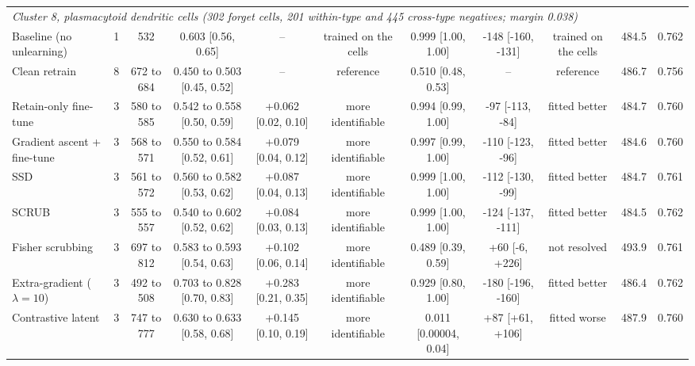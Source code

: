 \begin{tabular}{lcccccccccc}
\midrule
\multicolumn{11}{l}{\emph{Cluster 8, plasmacytoid dendritic cells (302 forget cells, 201 within-type and 445 cross-type negatives; margin 0.038)}} \\
Baseline (no unlearning) & 1 & 532 & 0.603 [0.56, 0.65] & -- & trained on the cells & 0.999 [1.00, 1.00] & -148 [-160, -131] & trained on the cells & 484.5 & 0.762 \\
Clean retrain & 8 & 672 to 684 & 0.450 to 0.503 [0.45, 0.52] & -- & reference & 0.510 [0.48, 0.53] & -- & reference & 486.7 & 0.756 \\
\midrule
Retain-only fine-tune & 3 & 580 to 585 & 0.542 to 0.558 [0.50, 0.59] & +0.062 [0.02, 0.10] & more identifiable & 0.994 [0.99, 1.00] & -97 [-113, -84] & fitted better & 484.7 & 0.760 \\
Gradient ascent + fine-tune & 3 & 568 to 571 & 0.550 to 0.584 [0.52, 0.61] & +0.079 [0.04, 0.12] & more identifiable & 0.997 [0.99, 1.00] & -110 [-123, -96] & fitted better & 484.6 & 0.760 \\
SSD & 3 & 561 to 572 & 0.560 to 0.582 [0.53, 0.62] & +0.087 [0.04, 0.13] & more identifiable & 0.999 [1.00, 1.00] & -112 [-130, -99] & fitted better & 484.7 & 0.761 \\
SCRUB & 3 & 555 to 557 & 0.540 to 0.602 [0.52, 0.62] & +0.084 [0.03, 0.13] & more identifiable & 0.999 [1.00, 1.00] & -124 [-137, -111] & fitted better & 484.5 & 0.762 \\
Fisher scrubbing & 3 & 697 to 812 & 0.583 to 0.593 [0.54, 0.63] & +0.102 [0.06, 0.14] & more identifiable & 0.489 [0.39, 0.59] & +60 [-6, +226] & not resolved & 493.9 & 0.761 \\
Extra-gradient ($\lambda=10$) & 3 & 492 to 508 & 0.703 to 0.828 [0.70, 0.83] & +0.283 [0.21, 0.35] & more identifiable & 0.929 [0.80, 1.00] & -180 [-196, -160] & fitted better & 486.4 & 0.762 \\
Contrastive latent & 3 & 747 to 777 & 0.630 to 0.633 [0.58, 0.68] & +0.145 [0.10, 0.19] & more identifiable & 0.011 [0.00004, 0.04] & +87 [+61, +106] & fitted worse & 487.9 & 0.760 \\
\bottomrule
\end{tabular}

